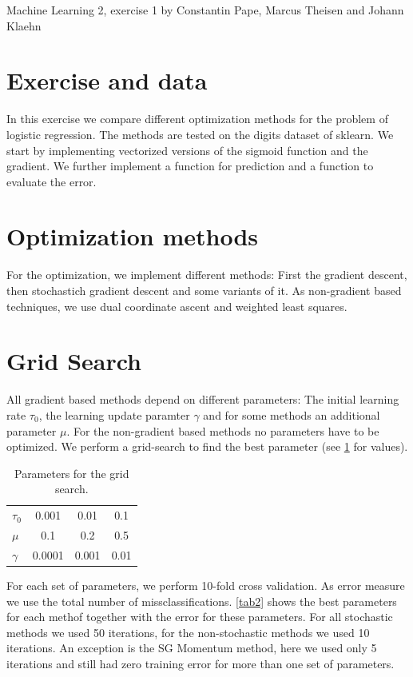 \documentclass{article}
\begin{document}
Machine Learning 2, exercise 1 by Constantin Pape, Marcus Theisen and Johann Klaehn
 
\section{Exercise and data}

In this exercise we compare different optimization methods for the problem of logistic regression.
The methods are tested on the digits dataset of sklearn.
We start by implementing vectorized versions of the sigmoid function and the gradient.
We further implement a function for prediction and a function to evaluate the error.

\section{Optimization methods}

For the optimization, we implement different methods:
First the gradient descent, then stochastich gradient descent and some variants of it.
As non-gradient based techniques, we use dual coordinate ascent and weighted least squares.

\section{Grid Search}

All gradient based methods depend on different parameters: The initial learning rate $\tau_0$, the learning update paramter $\gamma$ and for some methods an additional parameter $\mu$.
For the non-gradient based methods no parameters have to be optimized.
We perform a grid-search to find the best parameter (see \ref{tab1} for values).

\begin{table}[h]
	\centering
	\begin{tabular}{l c c c}
		$\tau_0$	&	0.001	& 0.01	& 0.1	\\
		$\mu$		&	0.1	& 0.2	& 0.5	\\
	 	$\gamma$ 	& 	0.0001	& 0.001	& 0.01	\\
	\end{tabular}
	\caption{Parameters for the grid search.}
	\label{tab1}
\end{table}

For each set of parameters, we perform 10-fold cross validation. As error measure we use the total number of missclassifications.  \autoref{tab2} shows the best parameters for each methof together with the error for these parameters. For all stochastic methods we used 50 iterations, for the non-stochastic methods we used 10 iterations.
An exception is the SG Momentum method, here we used only 5 iterations and still had zero training error for more than one set of parameters. 
\end{document}
